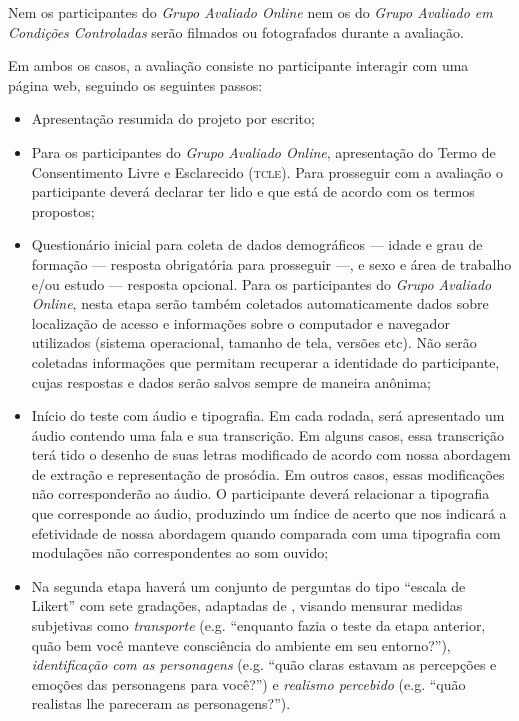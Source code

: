\documentclass[a4paper,11pt,titlepage,singlespacing]{article}
\newcommand\todo[1]{\textcolor{red}{#1}}
\begin{document}



Nem os participantes do \textit{Grupo Avaliado Online} nem os do \textit{Grupo Avaliado em Condições Controladas} serão filmados ou fotografados durante a avaliação.

Em ambos os casos, a avaliação consiste no participante interagir com uma página web, seguindo os seguintes passos:

\begin{itemize}
    \item Apresentação resumida do projeto por escrito;
    \item Para os participantes do \textit{Grupo Avaliado Online}, apresentação do Termo de Consentimento Livre e Esclarecido (\textsc{tcle}). Para prosseguir com a avaliação o participante deverá declarar ter lido e que está de acordo com os termos propostos;
    \item Questionário inicial para coleta de dados demográficos — idade e grau de formação — resposta obrigatória para prosseguir —, e sexo e área de trabalho e/ou estudo — resposta opcional. Para os participantes do \textit{Grupo Avaliado Online}, nesta etapa serão também coletados automaticamente dados sobre localização de acesso e informações sobre o computador e navegador utilizados (sistema operacional, tamanho de tela, versões etc). Não serão coletadas informações que permitam recuperar a identidade do participante, cujas respostas e dados serão salvos sempre de maneira anônima; 
    \item Início do teste com áudio e tipografia. Em cada rodada, será apresentado um áudio contendo uma fala e sua transcrição. Em alguns casos, essa transcrição terá tido o desenho de suas letras modificado de acordo com nossa abordagem de extração e representação de prosódia. Em outros casos, essas modificações não corresponderão ao áudio. O participante deverá relacionar a tipografia que corresponde ao áudio, produzindo um índice de acerto que nos indicará a efetividade de nossa abordagem quando comparada com uma tipografia com modulações não correspondentes ao som ouvido;
    \item Na segunda etapa haverá um conjunto de perguntas do tipo ``escala de Likert'' com sete gradações, adaptadas de , visando mensurar medidas subjetivas como \textit{transporte} (e.g. “enquanto fazia o teste da etapa anterior, quão bem você manteve consciência do ambiente em seu entorno?”), \textit{identificação com as personagens} (e.g. “quão claras estavam as percepções e emoções das personagens para você?”) e \textit{realismo percebido} (e.g. “quão realistas lhe pareceram as personagens?”). 
\end{itemize}
\end{document}
